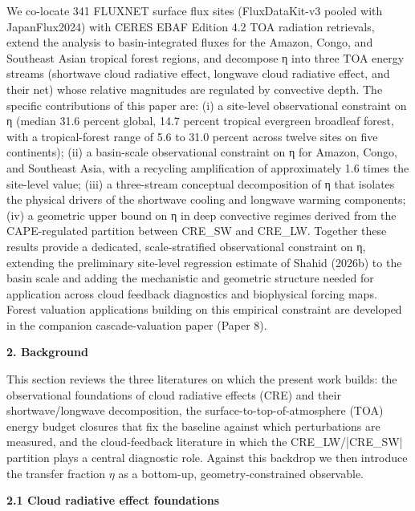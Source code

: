 We co-locate 341 FLUXNET surface flux sites (FluxDataKit-v3 pooled with JapanFlux2024) with CERES EBAF Edition 4.2 TOA radiation retrievals, extend the analysis to basin-integrated fluxes for the Amazon, Congo, and Southeast Asian tropical forest regions, and decompose η into three TOA energy streams (shortwave cloud radiative effect, longwave cloud radiative effect, and their net) whose relative magnitudes are regulated by convective depth. The specific contributions of this paper are: (i) a site-level observational constraint on η (median 31.6 percent global, 14.7 percent tropical evergreen broadleaf forest, with a tropical-forest range of 5.6 to 31.0 percent across twelve sites on five continents); (ii) a basin-scale observational constraint on η for Amazon, Congo, and Southeast Asia, with a recycling amplification of approximately 1.6 times the site-level value; (iii) a three-stream conceptual decomposition of η that isolates the physical drivers of the shortwave cooling and longwave warming components; (iv) a geometric upper bound on η in deep convective regimes derived from the CAPE-regulated partition between CRE_SW and CRE_LW. Together these results provide a dedicated, scale-stratified observational constraint on η, extending the preliminary site-level regression estimate of Shahid (2026b) to the basin scale and adding the mechanistic and geometric structure needed for application across cloud feedback diagnostics and biophysical forcing maps. Forest valuation applications building on this empirical constraint are developed in the companion cascade-valuation paper (Paper 8).

\textbf{2. Background}

This section reviews the three literatures on which the present work builds: the observational foundations of cloud radiative effects (CRE) and their shortwave/longwave decomposition, the surface-to-top-of-atmosphere (TOA) energy budget closures that fix the baseline against which perturbations are measured, and the cloud-feedback literature in which the CRE_LW/|CRE_SW| partition plays a central diagnostic role. Against this backdrop we then introduce the transfer fraction $\eta$ as a bottom-up, geometry-constrained observable.

\textbf{2.1 Cloud radiative effect foundations}

